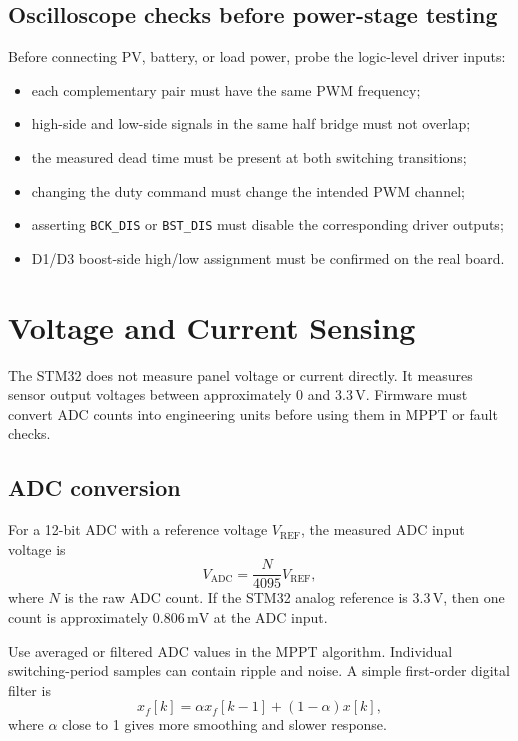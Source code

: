 \documentclass[11pt,a4paper]{article}
\newcommand{\code}[1]{\texttt{#1}}
\newcommand{\Vadc}{V_{\mathrm{ADC}}}
\newcommand{\Vref}{V_{\mathrm{REF}}}
\let\originalsection\section
\renewcommand{\section}{\clearpage\originalsection}
\begin{document}
\subsection{Oscilloscope checks before power-stage testing}

Before connecting PV, battery, or load power, probe the logic-level driver inputs:
\begin{itemize}
  \item each complementary pair must have the same PWM frequency;
  \item high-side and low-side signals in the same half bridge must not overlap;
  \item the measured dead time must be present at both switching transitions;
  \item changing the duty command must change the intended PWM channel;
  \item asserting \code{BCK\_DIS} or \code{BST\_DIS} must disable the corresponding driver outputs;
  \item D1/D3 boost-side high/low assignment must be confirmed on the real board.
\end{itemize}

\section{Voltage and Current Sensing}
\label{sec:sensing}

The STM32 does not measure panel voltage or current directly. It measures sensor output voltages between approximately $0$ and $3.3\,\mathrm{V}$. Firmware must convert ADC counts into engineering units before using them in MPPT or fault checks.

\subsection{ADC conversion}

For a 12-bit ADC with a reference voltage $\Vref$, the measured ADC input voltage is
\begin{equation}
  \Vadc = \frac{N}{4095}\Vref,
  \label{eq:adc-voltage}
\end{equation}
where $N$ is the raw ADC count. If the STM32 analog reference is $3.3\,\mathrm{V}$, then one count is approximately $0.806\,\mathrm{mV}$ at the ADC input.

Use averaged or filtered ADC values in the MPPT algorithm. Individual switching-period samples can contain ripple and noise. A simple first-order digital filter is
\begin{equation}
  x_f[k] = \alpha x_f[k-1] + (1-\alpha)x[k],
\end{equation}
where $\alpha$ close to 1 gives more smoothing and slower response.
\end{document}
